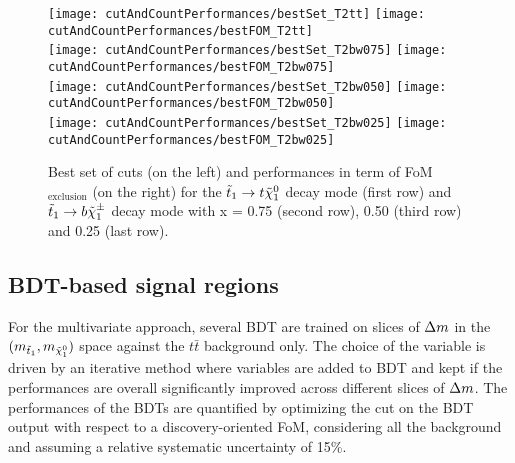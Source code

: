             \begin{figure}[h!]
                \centering
                \texttt{[image: cutAndCountPerformances/bestSet\_T2tt]}
                \texttt{[image: cutAndCountPerformances/bestFOM\_T2tt]}\\
                \texttt{[image: cutAndCountPerformances/bestSet\_T2bw075]}
                \texttt{[image: cutAndCountPerformances/bestFOM\_T2bw075]}\\
                \texttt{[image: cutAndCountPerformances/bestSet\_T2bw050]}
                \texttt{[image: cutAndCountPerformances/bestFOM\_T2bw050]}\\
                \texttt{[image: cutAndCountPerformances/bestSet\_T2bw025]}
                \texttt{[image: cutAndCountPerformances/bestFOM\_T2bw025]}
                \caption{Best set of cuts (on the left) and performances in term of FoM$_\text{exclusion}$ (on the right) for the $\tilde{t}_1 \rightarrow t \tilde{\chi}_1^0$ decay mode (first row) and $\tilde{t}_1 \rightarrow b \tilde{\chi}_1^\pm$ decay mode with x = 0.75 (second row), 0.50 (third row) and 0.25 (last row).}                                                     
                \label{fig:cutAndCountPerformances}
            \end{figure}

        \subsection{BDT-based signal regions}
        
            For the multivariate approach, several BDT are trained on slices of $\Delta m$ in the $(m_{\tilde{t}_1},m_{\tilde{\chi}_1^0})$
            space against the $t\bar{t}$ background only. The choice of the variable is driven by an iterative method where variables 
            are added to BDT and kept if the performances are overall significantly improved across different slices of $\Delta m$. The 
            performances of the BDTs are quantified by optimizing the cut on the BDT output with respect to a discovery-oriented 
            FoM, considering all the background and assuming a relative systematic uncertainty of 15\%.

